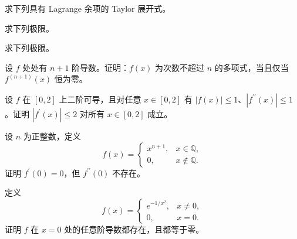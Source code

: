 \noindent\begin{minipage}{\textwidth}
求下列具有 Lagrange 余项的 Taylor 展开式。
\end{minipage}\par\vfill
\noindent\begin{minipage}{\textwidth}
求下列极限。
\end{minipage}\par\vfill
\noindent\begin{minipage}{\textwidth}
求下列极限。
\end{minipage}\par\vfill
\newpage
\noindent\begin{minipage}{\textwidth}
设 $f$ 处处有 $n+1$ 阶导数。证明：$f(x)$ 为次数不超过 $n$ 的多项式，当且仅当 $f^{(n+1)}(x)$ 恒为零。
\end{minipage}\par\vfill
\noindent\begin{minipage}{\textwidth}
设 $f$ 在 $[0,2]$ 上二阶可导，且对任意 $x\in[0,2]$ 有 $|f(x)|\le1$、$|f^{\prime\prime}(x)|\le1$。证明 $|f^{\prime}(x)|\le2$ 对所有 $x\in[0,2]$ 成立。
\end{minipage}\par\vfill
\noindent\begin{minipage}{\textwidth}
设 $n$ 为正整数，定义\[f(x)=\begin{cases}x^{n+1},&x\in\mathbb Q,\\0,&x\notin\mathbb Q.\end{cases}\]证明 $f^{\prime}(0)=0$，但 $f^{\prime\prime}(0)$ 不存在。
\end{minipage}\par\vfill
\noindent\begin{minipage}{\textwidth}
定义\[f(x)=\begin{cases}e^{-1/x^2},&x\ne0,\\0,&x=0.\end{cases}\]证明 $f$ 在 $x=0$ 处的任意阶导数都存在，且都等于零。
\end{minipage}\par\vfill
